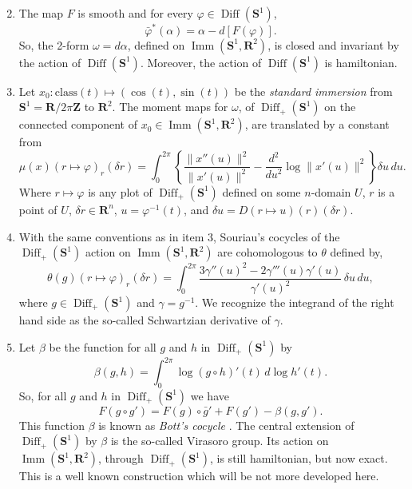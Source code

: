\documentclass[10pt,reqno,twoside]{amsart}
\DeclareMathOperator{\Diff}{Diff}
\DeclareMathOperator{\Imm}{Imm}
\theoremstyle{plain}
\theoremstyle{definition}
\begin{document}
  \begin{enumerate}
    \setcounter{enumi}{1}
    \item The map $F$ is smooth and for every $\varphi \in \Diff(\mathbf{S}^1)$,
    \[
    \bar{\varphi}^*(\alpha) = \alpha - d[F(\varphi)].
    \]
    So,
    the 2-form $\omega = d\alpha$,
    defined on $\Imm(\mathbf{S}^1,\mathbf{R}^2)$,
    is closed and invariant by the action of $\Diff(\mathbf{S}^1)$.
    Moreover,
    the action of $\Diff(\mathbf{S}^1)$ is hamiltonian.
    
    \item Let $x_0 : \mathrm{class}(t) \mapsto (\cos(t),\sin(t))$ be the \emph{standard immersion} from $\mathbf{S}^1 = \mathbf{R}/2\pi\mathbf{Z}$ to $\mathbf{R}^2$.
    The moment maps for $\omega$,
    of $\Diff_+(\mathbf{S}^1)$ on the connected component of $x_0 \in \Imm(\mathbf{S}^1,\mathbf{R}^2)$,
    are translated by a constant from
    \[
    \mu(x)(r \mapsto \varphi)_r(\delta r) = \int_0^{2\pi} \left\{ \frac{ \lVert x''(u)\rVert^2 }{ \lVert x'(u)\rVert^2} - \frac{d^2}{du^2} \log \lVert x'(u)\rVert^2 \right\} \delta u \, du.
    \]
    Where $r \mapsto \varphi$ is any plot of $\Diff_+(\mathbf{S}^1)$ defined on some $n$-domain $U$,
    $r$ is a point of $U$,
    $\delta r \in \mathbf{R}^n$,
    $u = \varphi^{-1}(t)$,
    and $\delta u = D(r \mapsto u)(r)(\delta r)$.
    
    \item With the same conventions as in item 3,
    Souriau's cocycles of the $\Diff_+(\mathbf{S}^1)$ action on $\Imm(\mathbf{S}^1,\mathbf{R}^2)$ are cohomologous to $\theta$ defined by,
    \[
    \theta(g)(r \mapsto \varphi)_r(\delta r) = \int_0^{2\pi} \frac{3 \gamma''(u)^2 -2 \gamma'''(u) \gamma'(u)}{\gamma'(u)^2} \, \delta u \, du,
    \]
    where $g \in \Diff_+(\mathbf{S}^1)$ and $\gamma = g^{-1}$.
    We recognize the integrand of the right hand side as the so-called Schwartzian derivative of $\gamma$.
    
    \item Let $\beta$ be the function for all $g$ and $h$ in $\Diff_+(\mathbf{S}^1)$ by
    \[
    \beta(g,h) = \int_0^{2\pi} \log(g \circ h)'(t) \, d\log h'(t).
    \]
    So,
    for all $g$ and $h$ in $\Diff_+(\mathbf{S}^1)$ we have
    \[
    F(g \circ g') = F(g)\circ \bar{g}' + F(g') - \beta(g,g').
    \]
    This function $\beta$ is known as \emph{Bott's cocycle} \cite{Bot78}.
    The central extension of $\Diff_+(\mathbf{S}^1)$ by $\beta$ is the so-called Virasoro group.
    Its action on $\Imm(\mathbf{S}^1,\mathbf{R}^2)$,
    through $\Diff_+(\mathbf{S}^1)$,
    is still hamiltonian,
    but now exact.
    This is a well known construction which will be not more developed here.
  \end{enumerate}
  
\end{document}
